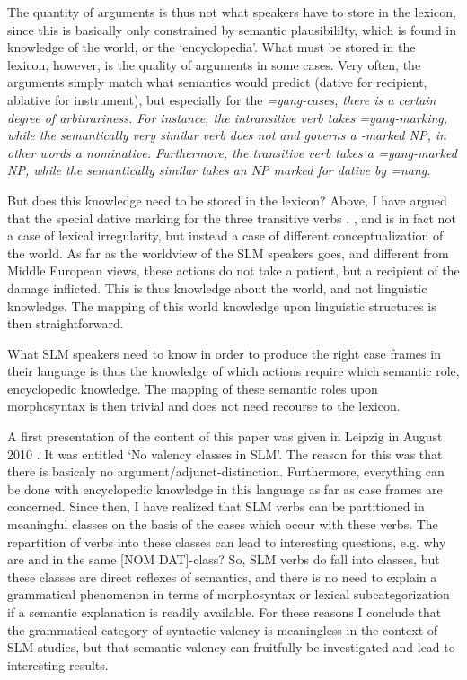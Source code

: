 \documentclass[a4paper,10pt]{article}
\begin{document}
The quantity of arguments is thus not what speakers have to store in the lexicon, since this is basically only constrained by semantic plausibililty, which is found in knowledge of the world, or the `encyclopedia'. What must be stored in the lexicon, however, is the quality of arguments in some cases. Very often, the arguments simply match what semantics would predict (dative for recipient, ablative for instrument), but especially for the \em =yang\em-cases, there is a certain degree of arbitrariness. For instance, the intransitive verb  takes \em =yang\em-marking, while the semantically very similar verb  does not and governs a \zero{}-marked NP, in other words a nominative. Furthermore, the transitive verb  takes a \em =yang\em-marked NP, while the semantically similar  takes an NP marked for dative by \em =nang\em.

But does this knowledge need to be stored in the lexicon? Above, I have argued that the special dative marking for the three transitive verbs , , and  is in fact not a case of lexical irregularity, but instead a case of different conceptualization of the world. As far as the worldview of the SLM speakers goes, and different from Middle European views, these actions do not take a patient, but a recipient of the damage inflicted. This is thus knowledge about the world, and not linguistic knowledge. The mapping of this world knowledge upon linguistic structures is then straightforward.

What SLM speakers need to know in order to produce the right case frames in their language is thus the knowledge of which actions require which semantic role, encyclopedic knowledge. The mapping of these semantic roles upon morphosyntax is then trivial and does not need recourse to the lexicon.

A first presentation of the content of this paper was given in Leipzig in August 2010 \citep{Nordhoff2010valency}. It was entitled `No valency classes in SLM'. The reason for this was that there is basicaly no argument/adjunct-distinction. Furthermore, everything can be done with encyclopedic knowledge in this language as far as case frames are concerned. Since then, I have realized that SLM verbs can be partitioned in meaningful classes on the basis of the cases which occur with these verbs. The repartition of verbs into these classes can lead to interesting questions, e.g. why are  and  in the same [NOM DAT]-class? So, SLM verbs do fall into classes, but these classes are direct reflexes of semantics, and there is no need to explain a grammatical phenomenon in terms of morphosyntax or lexical subcategorization if a semantic explanation is readily available. For these reasons I conclude that the grammatical category of syntactic valency is meaningless in the context of SLM studies, but that semantic valency can fruitfully be investigated and lead to interesting results.




\end{document}
